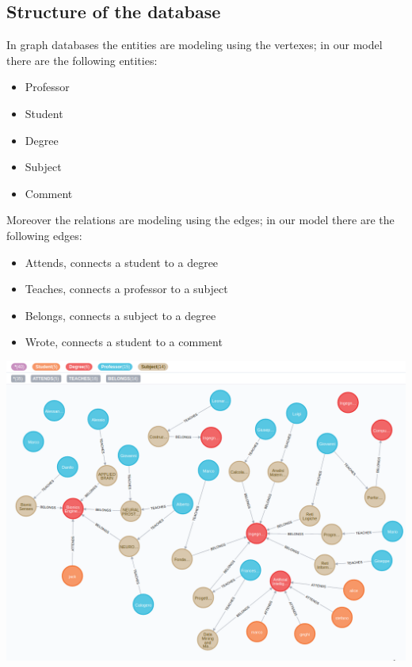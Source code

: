 \documentclass[a4paper]{article}
\begin{document}
\subsection{Structure of the database}
In graph databases the entities are modeling using the vertexes; in our model there are the following entities:
\begin{itemize}
\item Professor
\item Student
\item Degree
\item Subject
\item Comment
\end{itemize}
Moreover the relations are modeling using the edges; in our model there are the following edges:
\begin{itemize}
\item Attends, connects a student to a degree
\item Teaches, connects a professor to a subject
\item Belongs, connects a subject to a degree
\item Wrote, connects a student to a comment
\end{itemize}


\begin{minipage}{\linewidth}
\begin{center}
\vspace{4mm}
\includegraphics[width = 1\textwidth]{./images/diagrams/graphDb.png} 
\vspace{2mm}
\label{fig:analisys_diagram}
\end{center}
\end{minipage}
\clearpage
\end{document}
